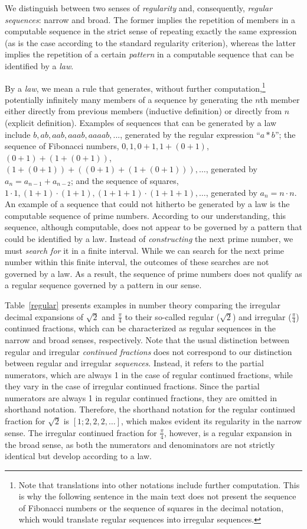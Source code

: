 \documentclass[%
  manuscript=article,   %
  year=2024,
  volume=77,
  doi=00000.000,
]{zfn}
\begin{document}
We distinguish between two senses of \emph{regularity} and, consequently, \emph{regular sequences}: narrow and broad. The former implies the repetition of members in a computable sequence in the strict sense of repeating exactly the same expression (as is the case according to the standard regularity criterion), whereas the latter implies the repetition of a certain \emph{pattern} in a computable sequence that can be identified by a \textit{law}.

By a \textit{law}, we mean a rule that generates, without further computation,\footnote{Note that translations into other notations include further computation. This is why the following sentence in the main text does not present the sequence of Fibonacci numbers or the sequence of squares in the decimal notation, which would translate regular sequences into irregular sequences.} potentially infinitely many members of a sequence by generating the $n$th member either directly from previous members (inductive definition) or directly from $n$ (explicit definition).
Examples of sequences that can be generated by a law include $b,ab,aab,aaab,aaaab,...$, generated by the regular expression ``$a{*}b$''; the sequence of Fibonacci numbers, $0,1,0+1,1+(0+1)$, $(0+1)+(1+(0+1))$, $(1+(0+1))+((0+1)+(1+(0+1))),\ldots$, generated by $a_{n} = a_{n-1}+a_{n-2}$; and the sequence of squares, $1\cdot 1,(1+1)\cdot(1+1),(1+1+1)\cdot(1+1+1), \ldots$, generated by $a_{n} = n\cdot n$. An example of a sequence that could not hitherto be generated by a law is the computable sequence of prime numbers. According to our understanding, this sequence, although computable, does not appear to be governed by a pattern that could be identified by a law. Instead of \textit{constructing} the next prime number, we must \textit{search for} it in a finite interval. While we can search for the next prime number within this finite interval, the outcomes of these searches are not governed by a law. As a result, the sequence of prime numbers does not %
qualify as a regular sequence governed by a pattern in our sense.


Table~\ref{regular} presents examples in number theory comparing the irregular decimal expansions of $\sqrt{2}$ and $\frac{\pi}{4}$ to their so-called regular ($\sqrt{2}$) and irregular ($\frac{\pi}{4}$) continued fractions, which can be characterized as regular sequences in the narrow and broad senses, respectively.
Note that the usual distinction between regular and irregular \emph{continued fractions} does not correspond to our distinction between regular and irregular \emph{sequences}. Instead, it refers to the partial numerators, which are always 1 in the case of regular continued fractions, while they vary in the case of irregular continued fractions.
Since the partial numerators are always 1 in regular continued fractions,
they are omitted in shorthand notation. Therefore, the shorthand notation for the regular continued fraction for $\sqrt{2}$ is $[1;2,2,2, \ldots]$, which makes evident its regularity in the narrow sense. The irregular continued fraction for $\frac{\pi}{4}$, however, is a regular expansion in the broad sense, as both the numerators and denominators are not strictly identical but develop according to a law.
\end{document}
